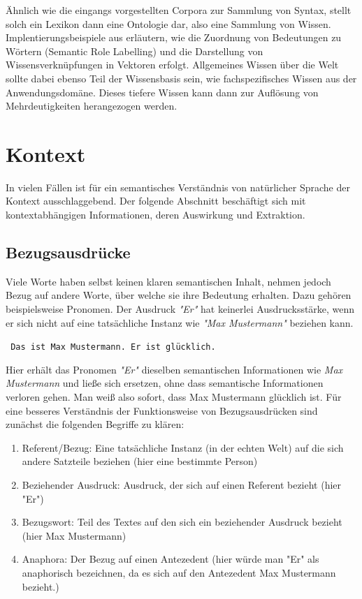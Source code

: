 \documentclass[12pt]{report}
\begin{document}
Ähnlich wie die eingangs vorgestellten Corpora zur Sammlung von Syntax, stellt solch ein Lexikon dann eine Ontologie dar, also eine Sammlung von Wissen. Implentierungsbeispiele aus \cite{col11} erläutern, wie die Zuordnung von Bedeutungen zu Wörtern (Semantic Role Labelling) und die Darstellung von Wissensverknüpfungen in Vektoren erfolgt. Allgemeines Wissen über die Welt sollte dabei ebenso Teil der Wissensbasis sein, wie fachspezifisches Wissen aus der Anwendungsdomäne. Dieses tiefere Wissen kann dann zur Auflösung von Mehrdeutigkeiten herangezogen werden.

\section{Kontext}
In vielen Fällen ist für ein semantisches Verständnis von natürlicher Sprache der Kontext ausschlaggebend. Der folgende Abschnitt beschäftigt sich mit kontextabhängigen Informationen, deren Auswirkung und Extraktion. 

\subsection{Bezugsausdrücke}
Viele Worte haben selbst keinen klaren semantischen Inhalt, nehmen jedoch Bezug auf andere Worte, über welche sie ihre Bedeutung erhalten. Dazu gehören beispielsweise Pronomen. Der Ausdruck \textit{"Er"} hat keinerlei Ausdrucksstärke, wenn er sich nicht auf eine tatsächliche Instanz wie \textit{"Max Mustermann"} beziehen kann.

\tt
Das ist Max Mustermann. Er ist glücklich.
\rm

Hier erhält das Pronomen \textit{"Er"} dieselben semantischen Informationen wie \textit{Max Mustermann} und ließe sich ersetzen, ohne dass semantische Informationen verloren gehen. Man weiß also sofort, dass Max Mustermann glücklich ist. Für eine besseres Verständnis der Funktionsweise von Bezugsausdrücken sind zunächst die folgenden Begriffe zu klären:

\begin{enumerate}
\item Referent/Bezug: Eine tatsächliche Instanz (in der echten Welt) auf die sich andere Satzteile beziehen (hier eine bestimmte Person)
\item Beziehender Ausdruck: Ausdruck, der sich auf einen Referent bezieht (hier "Er")
\item Bezugswort: Teil des Textes auf den sich ein beziehender Ausdruck bezieht (hier Max Mustermann)
\item Anaphora: Der Bezug auf einen Antezedent (hier würde man "Er" als anaphorisch bezeichnen, da es sich auf den Antezedent Max Mustermann bezieht.) 
\end{enumerate}
\end{document}
